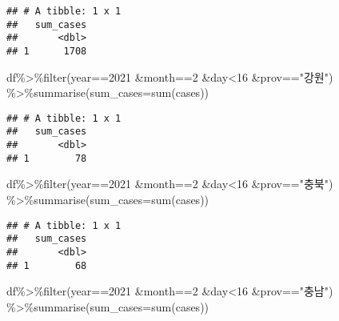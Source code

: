 \documentclass[
]{article}
\newenvironment{Shaded}{\begin{snugshade}}{\end{snugshade}}
\newcommand{\AttributeTok}[1]{\textcolor[rgb]{0.77,0.63,0.00}{#1}}
\newcommand{\DecValTok}[1]{\textcolor[rgb]{0.00,0.00,0.81}{#1}}
\newcommand{\FunctionTok}[1]{\textcolor[rgb]{0.00,0.00,0.00}{#1}}
\newcommand{\NormalTok}[1]{#1}
\newcommand{\SpecialCharTok}[1]{\textcolor[rgb]{0.00,0.00,0.00}{#1}}
\newcommand{\StringTok}[1]{\textcolor[rgb]{0.31,0.60,0.02}{#1}}
\begin{document}
\begin{verbatim}
## # A tibble: 1 x 1
##   sum_cases
##       <dbl>
## 1      1708
\end{verbatim}

\begin{Shaded}
\begin{Highlighting}[]
\NormalTok{df}\SpecialCharTok{\%\textgreater{}\%}\FunctionTok{filter}\NormalTok{(year}\SpecialCharTok{==}\DecValTok{2021} \SpecialCharTok{\&}\NormalTok{month}\SpecialCharTok{==}\DecValTok{2} \SpecialCharTok{\&}\NormalTok{day}\SpecialCharTok{\textless{}}\DecValTok{16} \SpecialCharTok{\&}\NormalTok{prov}\SpecialCharTok{==}\StringTok{"강원"}\NormalTok{) }\SpecialCharTok{\%\textgreater{}\%}\FunctionTok{summarise}\NormalTok{(}\AttributeTok{sum\_cases=}\FunctionTok{sum}\NormalTok{(cases))}
\end{Highlighting}
\end{Shaded}

\begin{verbatim}
## # A tibble: 1 x 1
##   sum_cases
##       <dbl>
## 1        78
\end{verbatim}

\begin{Shaded}
\begin{Highlighting}[]
\NormalTok{df}\SpecialCharTok{\%\textgreater{}\%}\FunctionTok{filter}\NormalTok{(year}\SpecialCharTok{==}\DecValTok{2021} \SpecialCharTok{\&}\NormalTok{month}\SpecialCharTok{==}\DecValTok{2} \SpecialCharTok{\&}\NormalTok{day}\SpecialCharTok{\textless{}}\DecValTok{16} \SpecialCharTok{\&}\NormalTok{prov}\SpecialCharTok{==}\StringTok{"충북"}\NormalTok{) }\SpecialCharTok{\%\textgreater{}\%}\FunctionTok{summarise}\NormalTok{(}\AttributeTok{sum\_cases=}\FunctionTok{sum}\NormalTok{(cases))}
\end{Highlighting}
\end{Shaded}

\begin{verbatim}
## # A tibble: 1 x 1
##   sum_cases
##       <dbl>
## 1        68
\end{verbatim}

\begin{Shaded}
\begin{Highlighting}[]
\NormalTok{df}\SpecialCharTok{\%\textgreater{}\%}\FunctionTok{filter}\NormalTok{(year}\SpecialCharTok{==}\DecValTok{2021} \SpecialCharTok{\&}\NormalTok{month}\SpecialCharTok{==}\DecValTok{2} \SpecialCharTok{\&}\NormalTok{day}\SpecialCharTok{\textless{}}\DecValTok{16} \SpecialCharTok{\&}\NormalTok{prov}\SpecialCharTok{==}\StringTok{"충남"}\NormalTok{) }\SpecialCharTok{\%\textgreater{}\%}\FunctionTok{summarise}\NormalTok{(}\AttributeTok{sum\_cases=}\FunctionTok{sum}\NormalTok{(cases))}
\end{Highlighting}
\end{Shaded}
\end{document}
